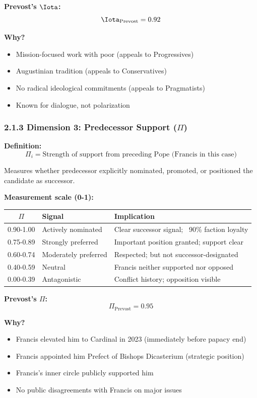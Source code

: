 \textbf{Prevost's $\Iota$:}
$$\Iota_{\text{Prevost}} = 0.92$$

\textbf{Why?}
\begin{itemize}
\item Mission-focused work with poor (appeals to Progressives)
\item Augustinian tradition (appeals to Conservatives)
\item No radical ideological commitments (appeals to Pragmatists)
\item Known for dialogue, not polarization
\end{itemize}

\subsubsection{2.1.3 Dimension 3: Predecessor Support ($\Pi$)}

\textbf{Definition:}
$$\Pi_i = \text{Strength of support from preceding Pope (Francis in this case)}$$

Measures whether predecessor explicitly nominated, promoted, or positioned the candidate as successor.

\textbf{Measurement scale (0-1):}

\begin{table}[h]
\centering
\begin{tabular}{|c|l|l|}
\hline
$\Pi$ & \textbf{Signal} & \textbf{Implication} \\
\hline
0.90-1.00 & Actively nominated & Clear successor signal; ~90\% faction loyalty \\
0.75-0.89 & Strongly preferred & Important position granted; support clear \\
0.60-0.74 & Moderately preferred & Respected; but not successor-designated \\
0.40-0.59 & Neutral & Francis neither supported nor opposed \\
0.00-0.39 & Antagonistic & Conflict history; opposition visible \\
\hline
\end{tabular}
\end{table}

\textbf{Prevost's $\Pi$:}
$$\Pi_{\text{Prevost}} = 0.95$$

\textbf{Why?}
\begin{itemize}
\item Francis elevated him to Cardinal in 2023 (immediately before papacy end)
\item Francis appointed him Prefect of Bishops Dicasterium (strategic position)
\item Francis's inner circle publicly supported him
\item No public disagreements with Francis on major issues
\end{itemize}

